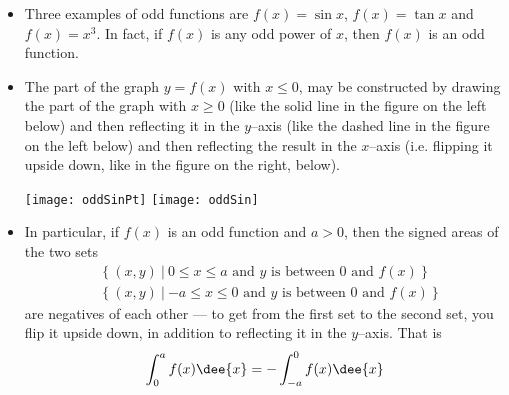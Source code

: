 \begin{eg}\label{eg:areaunderoddfunction}
   \begin{itemize}
   \item Three examples of odd functions are $f(x)=\sin x$, $f(x)=\tan x$ and
  $f(x)=x^3$. In fact, if $f(x)$ is any odd power of $x$, then $f(x)$ is
         an odd function.
   \item The part of the graph $y=f(x)$ with $x\le 0$, may be constructed by
drawing the part of the graph with $x\ge 0$ (like the solid line in the figure
on the left below) and then reflecting it in the $y$--axis (like the dashed
line
in the figure on the left below) and then reflecting the result in the $x$--axis
(i.e. flipping it upside down, like in the figure on the right, below).
        \begin{efig}
        \begin{center}
            \texttt{[image: oddSinPt]}\qquad
            \texttt{[image: oddSin]}
         \end{center}
         \end{efig}
\item In particular, if $f(x)$ is an odd function and $a>0$, then the
    signed areas of the two sets
   \begin{align*}
     &\big\{\ (x,y)\ \big|\
       \text{$0\le x\le a$ and $y$ is between $0$ and $f(x)$} \ \big\} \\
     &\big\{\ (x,y)\ \big|\
       \text{$-a\le x\le 0$ and $y$ is between $0$ and $f(x)$} \ \big\}
    \end{align*}
      are negatives of each other --- to get from the first set to the second
set, you flip it upside down, in addition to reflecting it in the $y$--axis.
That is
  \begin{align*}
        \int_0^a f(x)\dee{x} = -\int_{-a}^0 f(x)\dee{x}
  \end{align*}
   \end{itemize}
\end{eg}

